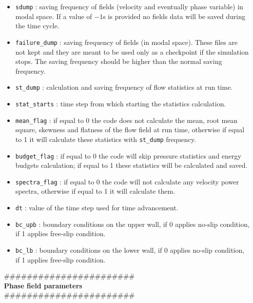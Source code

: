 \begin{itemize}[label={$\circ$}]
\item \texttt{sdump} : saving frequency of fields (velocity and eventually phase variable) in modal space. If a value of $-1$s is provided no fields data will be saved during the time cycle.
\item \texttt{failure\_dump} : saving frequency of fields (in modal space). These files are not kept and they are meant to be used only as a checkpoint if the simulation stops. The saving frequency should be higher than the normal saving frequency.
\item \texttt{st\_dump} : calculation and saving frequency of flow statistics at run time.
\item \texttt{stat\_starts} : time step from which starting the statistics calculation.
\item \texttt{mean\_flag} : if equal to 0 the code does not calculate the mean, root mean square, skewness and flatness of the flow field at run time, otherwise if equal to 1 it will calculate these statistics with \texttt{st\_dump} frequency.
\item \texttt{budget\_flag} : if equal to 0 the code will skip pressure statistics and energy budgets calculation; if equal to 1 these statistics will be calculated and saved.
\item \texttt{spectra\_flag} : if equal to 0 the code will not calculate any velocity power spectra, otherwise if equal to 1 it will calculate them.
\item \texttt{dt} : value of the time step used for time advancement.
\item \texttt{bc\_upb} : boundary conditions on the upper wall, if 0 applies no-slip condition, if 1 applies free-slip condition.
\item \texttt{bc\_lb} : boundary conditions on the lower wall, if 0 applies no-slip condition, if 1 applies free-slip condition.
\end{itemize}
\#\#\#\#\#\#\#\#\#\#\#\#\#\#\#\#\#\#\#\#\#\#\#\\
{\bf Phase field parameters}\\
\#\#\#\#\#\#\#\#\#\#\#\#\#\#\#\#\#\#\#\#\#\#\#
